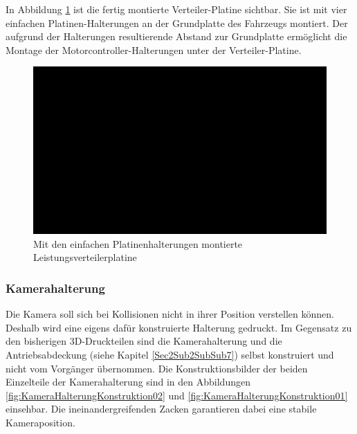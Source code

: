 In Abbildung \ref{fig:PlatinenHalterungenMontage} ist die fertig montierte Verteiler-Platine sichtbar. Sie ist mit vier einfachen Platinen-Halterungen an der Grundplatte des Fahrzeugs montiert. Der aufgrund der Halterungen resultierende Abstand zur Grundplatte ermöglicht die Montage der Motorcontroller-Halterungen unter der Verteiler-Platine.

\begin{figure}[H] %
\includegraphics[width=.70\textwidth]{sec2/images/3DAnbaukomponenten/Montagebilder/PlatinenHalterungenMontage} 
\centering
\captionsetup{width=.8\textwidth}
\caption[Mit den Platinenhalterungen montierte Leistungsverteilerplatine ]{Mit den einfachen Platinenhalterungen montierte Leistungsverteilerplatine}
\centering
\label{fig:PlatinenHalterungenMontage}
\end{figure}

\subsubsection{Kamerahalterung}\label{Sec2Sub2SubSub6}

Die Kamera soll sich bei Kollisionen nicht in ihrer Position verstellen können. Deshalb wird eine eigens dafür konstruierte Halterung gedruckt. Im Gegensatz zu den bisherigen 3D-Druckteilen sind die Kamerahalterung und die Antriebsabdeckung (siehe Kapitel \ref{Sec2Sub2SubSub7}) selbst konstruiert und nicht vom Vorgänger übernommen. Die Konstruktionsbilder der beiden Einzelteile der Kamerahalterung sind in den Abbildungen \ref{fig:KameraHalterungKonstruktion02} und \ref{fig:KameraHalterungKonstruktion01} einsehbar. Die ineinandergreifenden Zacken garantieren dabei eine stabile Kameraposition.

